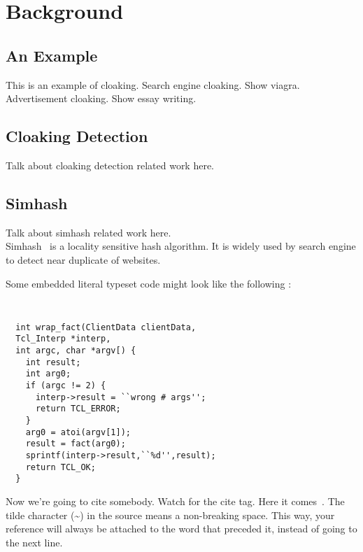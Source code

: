 \section{Background}
\label{s:background}
\subsection{An Example}
This is an example of cloaking. Search engine cloaking. Show viagra.
Advertisement cloaking. Show essay writing.


\subsection{Cloaking Detection}


Talk about cloaking detection related work here.

\subsection{Simhash}
Talk about simhash related work here. \\
Simhash~\cite{charikar2002similarity}  is a locality sensitive hash algorithm.
It is widely used by search engine to detect near duplicate of websites.



Some embedded literal typeset code might 
look like the following :

{\tt \small
  \begin{verbatim}
  int wrap_fact(ClientData clientData,
  Tcl_Interp *interp,
  int argc, char *argv[) {
    int result;
    int arg0;
    if (argc != 2) {
      interp->result = ``wrong # args'';
      return TCL_ERROR;
    }
    arg0 = atoi(argv[1]);
    result = fact(arg0);
    sprintf(interp->result,``%d'',result);
    return TCL_OK;
  }
  \end{verbatim}
}

Now we're going to cite somebody.  Watch
for the cite tag.
Here it comes~\cite{Chaum1981,Diffie1976}.
The tilde character (\~{})
in the source means a non-breaking space.
This way, your reference will
always be attached to the word that preceded it,
instead of going to the
next line.
